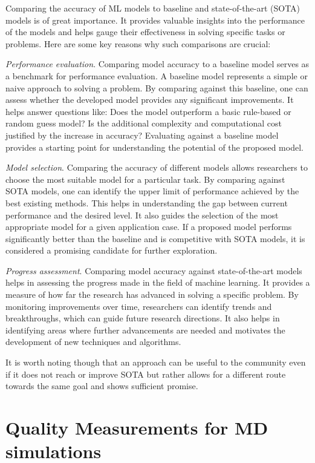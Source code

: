 \documentclass[9pt,bestpractices]{livecoms}
\begin{document}
Comparing the accuracy of ML models to baseline and state-of-the-art (SOTA)
models is of great importance. It provides valuable insights into the
performance of the models and helps gauge their effectiveness in solving
specific tasks or problems. Here are some key reasons why such comparisons are
crucial: 

\textit{Performance evaluation}. Comparing model accuracy to a baseline model
serves as a benchmark for performance evaluation. A baseline model represents a
simple or naive approach to solving a problem. By comparing against this
baseline, one can assess whether the developed model provides any significant
improvements. It helps answer questions like: Does the model outperform a basic
rule-based or random guess model? Is the additional complexity and computational
cost justified by the increase in accuracy? Evaluating against a baseline model
provides a starting point for understanding the potential of the proposed model.

\textit{Model selection}. Comparing the accuracy of different models allows
researchers to choose the most suitable model for a particular task. By
comparing against SOTA models, one can identify the upper limit of performance
achieved by the best existing methods. This helps in understanding the gap
between current performance and the desired level. It also guides the selection
of the most appropriate model for a given application case. If a proposed model
performs significantly better than the baseline and is competitive with SOTA
models, it is considered a promising candidate for further exploration.

\textit{Progress assessment}. Comparing model accuracy against state-of-the-art
models helps in assessing the progress made in the field of machine learning. It
provides a measure of how far the research has advanced in solving a specific
problem. By monitoring improvements over time, researchers can identify trends
and breakthroughs, which can guide future research directions. It also helps in
identifying areas where further advancements are needed and motivates the
development of new techniques and algorithms.

It is worth noting though that an approach can be useful to the community even if it does not reach or improve SOTA but rather allows for a different route towards the same goal and shows sufficient promise.

\section{Quality Measurements for MD simulations}
\end{document}
